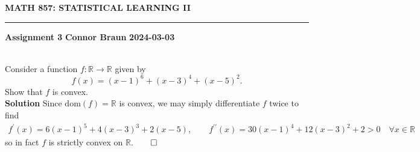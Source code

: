 \documentclass[10pt]{article}
\newcommand{\mbb}[1]{\mathbb{#1}}
\newcommand{\1}[1]{\mathbbm{1}_{#1}}
\begin{document}
    \begin{center}
        {\bf\large{MATH 857: STATISTICAL LEARNING II}}
        \smallskip
        \hrule
        \smallskip
        {\bf Assignment 3} \hfill {\bf Connor Braun} \hfill {\bf 2024-03-03}
    \end{center}
    \\[5pt]
    Consider a function $f:\mbb{R}\rightarrow\mbb{R}$ given by
    \[f(x)=(x-1)^6+(x-3)^4+(x-5)^2.\]
    Show that $f$ is convex.\\[5pt]
    {\bf Solution}\hspace{5pt} Since $\text{dom}(f)=\mbb{R}$ is convex, we may simply differentiate $f$ twice to find
    \begin{align*}
        f^\prime(x)=6(x-1)^5+4(x-3)^3+2(x-5),\qquad f^{\prime\prime}(x)=30(x-1)^4+12(x-3)^2+2>0\quad\forall x\in\mbb{R}
    \end{align*}
    so in fact $f$ is strictly convex on $\mbb{R}$.\hfill{$\qed$}
\end{document}
